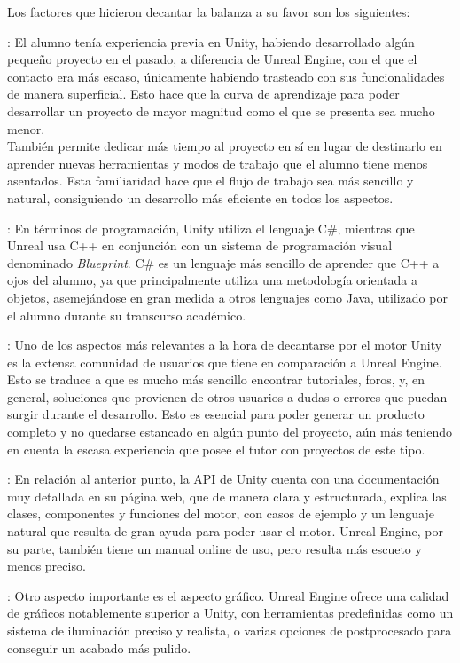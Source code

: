 Los factores que hicieron decantar la balanza a su favor son los siguientes:
\begin{description}
\tightlist
	\item [Experiencia]: El alumno tenía experiencia previa en Unity, habiendo desarrollado algún pequeño proyecto en el pasado, a diferencia de Unreal Engine, con el que el contacto era más escaso, únicamente habiendo trasteado con sus funcionalidades de manera superficial. Esto hace que la curva de aprendizaje para poder desarrollar un proyecto de mayor magnitud como el que se presenta sea mucho menor.\\
	También permite dedicar más tiempo al proyecto en sí en lugar de destinarlo en aprender nuevas herramientas y modos de trabajo que el alumno tiene menos asentados. Esta familiaridad hace que el flujo de trabajo sea más sencillo y natural, consiguiendo un desarrollo más eficiente en todos los aspectos.
	\item [Programación]: En términos de programación, Unity utiliza el lenguaje C\#, mientras que Unreal usa C++ en conjunción con un sistema de programación visual denominado \textit{Blueprint}. C\# es un lenguaje más sencillo de aprender que C++ a ojos del alumno, ya que principalmente utiliza una metodología orientada a objetos, asemejándose en gran medida a otros lenguajes como Java, utilizado por el alumno durante su transcurso académico.
	\item [Comunidad de usuarios]: Uno de los aspectos más relevantes a la hora de decantarse por el motor Unity es la extensa comunidad de usuarios que tiene en comparación a Unreal Engine. Esto se traduce a que es mucho más sencillo encontrar tutoriales, foros, y, en general, soluciones que provienen de otros usuarios a dudas o errores que puedan surgir durante el desarrollo. Esto es esencial para poder generar un producto completo y no quedarse estancado en algún punto del proyecto, aún más teniendo en cuenta la escasa experiencia que posee el tutor con proyectos de este tipo.
	\item [Documentación]: En relación al anterior punto, la API de Unity cuenta con una documentación muy detallada en su página web, que de manera clara y estructurada, explica las clases, componentes y funciones del motor, con casos de ejemplo y un lenguaje natural que resulta de gran ayuda para poder usar el motor. Unreal Engine, por su parte, también tiene un manual online de uso, pero resulta más escueto y menos preciso.
	\item [Gráficos]: Otro aspecto importante es el aspecto gráfico. Unreal Engine ofrece una calidad de gráficos notablemente superior a Unity, con herramientas predefinidas como un sistema de iluminación preciso y realista, o varias opciones de postprocesado para conseguir un acabado más pulido.

\end{description}
